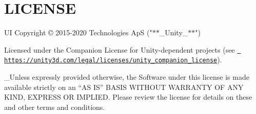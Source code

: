 \chapter{LICENSE}
\hypertarget{md__library_2_package_cache_2com_8unity_8ugui_0d1_80_80_2_l_i_c_e_n_s_e}{}\label{md__library_2_package_cache_2com_8unity_8ugui_0d1_80_80_2_l_i_c_e_n_s_e}
 UI Copyright © 2015-\/2020  Technologies ApS ("{}\texorpdfstring{$\ast$}{*}\texorpdfstring{$\ast$}{*}\+\_\+\+Unity\+\_\+\texorpdfstring{$\ast$}{*}\texorpdfstring{$\ast$}{*}"{})

Licensed under the  Companion License for Unity-\/dependent projects (see \href{https://unity3d.com/legal/licenses/unity_companion_license}{\texttt{ https\+://unity3d.\+com/legal/licenses/unity\+\_\+companion\+\_\+license}}).

\+\_\+\+Unless expressly provided otherwise, the Software under this license is made available strictly on an “\+AS IS” BASIS WITHOUT WARRANTY OF ANY KIND, EXPRESS OR IMPLIED. Please review the license for details on these and other terms and conditions. 